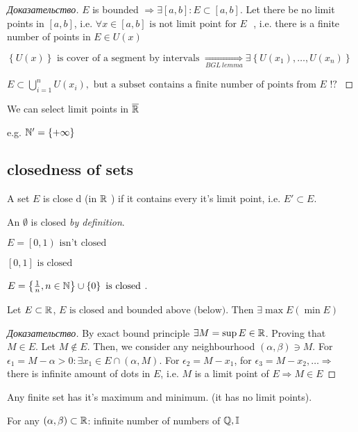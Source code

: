 \begin{proof}[Доказательство]
	$E$ is bounded $ \Rightarrow \exists \left[ a,b \right]: E \subset \left[ a,b \right]$. Let there be no limit points in $\left[ a,b \right]$, i.e. $\forall x \in \left[ a,b \right] \text{ is not limit point for $E$ }$, i.e. there is a finite number of points in $E \in U(x)$

	$\left\{ U(x) \right \} \text{ is cover of a segment by intervals } \underset{BGL \ lemma}{ \Rightarrow } \exists \left\{ U(x_1), \dots , U(x_n) \right \}   $

	$E \subset \bigcup_{i=1} ^ n U(x_i), \text{ but a subset contains a finite number of points from $E$ !? } $
\end{proof}


\begin{note}[]
	We can select limit points in $\overline{\mathbb{R}}$ 

	e.g. $\mathbb{N}' = \left\{ +\infty \right \} $
\end{note}

\subsection{closedness of sets}

\begin{definition}[]
	A set $E$ is close d (in $\mathbb{R}$ ) if it contains every it's limit point, i.e. $E' \subset E$.

	An $\emptyset$ is closed \textit{by definition}.
\end{definition}

\begin{example}[]
	$E = \left[ 0, 1 \right) \text{ isn't closed } $ 

	$\left[ 0,1 \right] \text{ is closed } $ 

	$E = \left\{ \frac{1}{n}, n \in \mathbb{N} \right \} \cup \left\{ 0 \right \} \text{ is closed } $.
\end{example}

\begin{lemma}
	Let $E \subset \mathbb{R}$, $E \text{ is closed and bounded above (below). Then }  \exists \max E (\min E)$
\end{lemma}

\begin{proof}[Доказательство]
	By exact bound principle $\exists M = \sup E \in \mathbb{R}$. Proving that $M \in E$. Let $M \notin E$. Then, we consider any neighbourhood $\left( \alpha, \beta \right) \ni M$. For $\epsilon_1 = M - \alpha > 0: \exists x_1 \in E \cap \left( \alpha, M \right)  $. For $\epsilon_2 = M - x_1$, for $\epsilon_3 = M - x_2, \dots  \Rightarrow $ there is infinite amount of dots in $E$, i.e. $M$ is a limit point of $E \Rightarrow M \in E$ 
\end{proof}

\begin{corollary}[]
	Any finite set has it's maximum and minimum. (it has no limit points).
\end{corollary}

\begin{corollary}[]
	For any $\left( \alpha, \beta \right) \subset \mathbb{R}$: infinite number of numbers of $\mathbb{Q}, \mathbb{I}$
\end{corollary}
